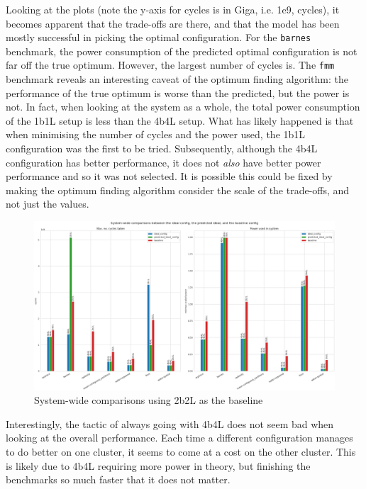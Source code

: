     Looking at the plots (note the y-axis for cycles is in Giga, i.e. 
    \textsf{1e9}, cycles), it becomes apparent that the trade-offs are there, 
    and that the model has been mostly successful in picking the optimal 
    configuration. For the \texttt{barnes} benchmark, the power consumption of 
    the predicted optimal configuration is not far off the true optimum. 
    However, the largest number of cycles is. The \texttt{fmm} benchmark reveals
    an interesting caveat of the optimum finding algorithm: the performance of
    the true optimum is worse than the predicted, but the power is not. In 
    fact, when looking at the system as a whole, the total power consumption of 
    the 1b1L setup is less than the 4b4L setup. What has likely happened is 
    that when minimising the number of cycles and the power used, the 1b1L 
    configuration was the first to be tried. Subsequently, although the 4b4L 
    configuration has better performance, it does not \emph{also} have better 
    power performance and so it was not selected. It is possible this could be 
    fixed by making the optimum finding algorithm consider the scale of the 
    trade-offs, and not just the values.
    \begin{figure}[H]
        \centering
        \includegraphics[width=\textwidth]{result-plots/stock-2b2L/system-bars.png}
        \caption{System-wide comparisons using 2b2L as the baseline}
        \label{fig:system-bars}
    \end{figure}

    Interestingly, the tactic of always going with 4b4L does not seem bad when 
    looking at the overall performance. Each time a different configuration 
    manages to do better on one cluster, it seems to come at a cost on the 
    other cluster. This is likely due to 4b4L requiring more power in theory, 
    but finishing the benchmarks so much faster that it does not matter.
    

